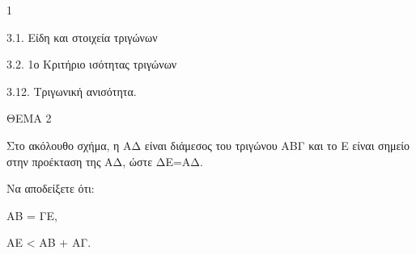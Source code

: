 \begin{ylh}{1}
    \item 3.1. Είδη και στοιχεία τριγώνων
    \item 3.2. 1ο Κριτήριο ισότητας τριγώνων
    \item 3.12. Τριγωνική ανισότητα.
\end{ylh}

ΘΕΜΑ 2

Στο ακόλουθο σχήμα, η ΑΔ είναι διάμεσος του τριγώνου ΑΒΓ και το Ε είναι σημείο στην προέκταση της ΑΔ, ώστε ΔΕ=ΑΔ.

Να αποδείξετε ότι:

\begin{alist}
\item ΑΒ = ΓΕ, 

\item ΑΕ \textless{} ΑΒ + ΑΓ. 


\begin{center}
\end{center}
\end{alist}
